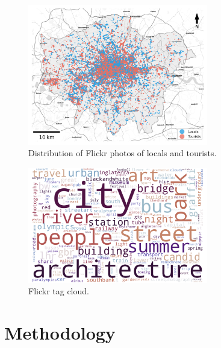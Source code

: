\documentclass{article}
\theoremstyle{remark}
\begin{document}
\begin{figure}[h!]
\centering
\includegraphics[width=0.7\textwidth]{figures/flickr_distribution.png}
\caption{\label{fig:flickr_distribution}Distribution of Flickr photos of locals and tourists.}
\end{figure}

\begin{figure}[h!]
\centering
\includegraphics[width=0.7\textwidth]{figures/flickr_tag_cloud.png}
\caption{\label{fig:flickr_tag_cloud}Flickr tag cloud.}
\end{figure}


\clearpage


\section{Methodology}
\end{document}
